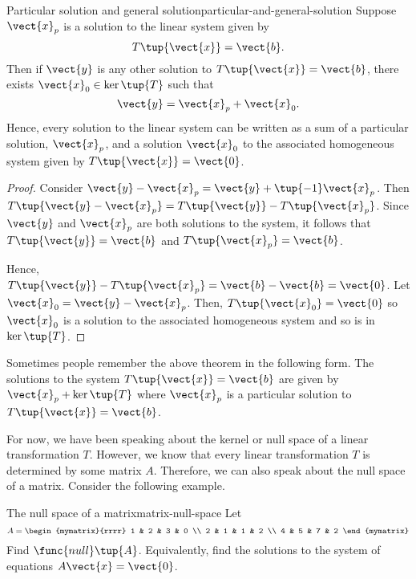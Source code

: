 \begin{theorem}{Particular solution and general solution}{particular-and-general-solution}
Suppose $\vect{x}_{p}$ is a solution to the linear system given by
\begin{equation*}
T\tup{\vect{x} } = \vect{b}.
\end{equation*}
Then if $\vect{y}$ is any other solution to $T\tup{\vect{x}}=\vect{b}$, 
 there exists $\vect{x}_0 \in \ker
\tup{T} $ such that
\begin{equation*}
\vect{y} = \vect{x}_{p}+ \vect{x}_0.
\end{equation*}
Hence, every solution to the linear system can be written as a sum of a particular solution, $\vect{x}_p$,
 and a solution $\vect{x}_0$ to the associated 
homogeneous system given by $T\tup{\vect{x}}=\vect{0}$.
\end{theorem}

\begin{proof}
Consider $\vect{y} - \vect{x}_{p}= \vect{y} + \tup{
-1} \vect{x}_{p}$. Then $T\tup{\vect{y} - \vect{x}_{p}} =T\tup{\vect{y}}
-T\tup{\vect{x}_{p} }$. Since $\vect{y}$ and $\vect{x}_{p}$ are both solutions to the system, it follows that $T\tup{\vect{y}}= \vect{b} $
and $T\tup{\vect{x}_p} = \vect{b}$. 

Hence, $T\tup{\vect{y}}-T\tup{\vect{x}_{p} }
=\vect{b} - \vect{b} = \vect{0}$.  Let $\vect{x}_0 = \vect{y} - \vect{x}_{p}$.
Then, $T\tup{\vect{x}_0}= \vect{0} $ so $\vect{x}_0$ is a solution to the associated homogeneous system and so is in $\ker \tup{T}$.
\end{proof}

Sometimes people remember the above theorem in the following form. The
solutions to the system $T\tup{\vect{x}}=\vect{b}$ are given by 
$\vect{x}_{p}+\ker \tup{T} $ where $\vect{x}_{p}$ is a particular
solution to $T\tup{\vect{x}}=\vect{b}$.

For now, we have been speaking about the kernel or null space of a linear transformation $T$. However, 
we know that every linear transformation $T$ is determined by some matrix $A$. Therefore,
we can also speak about the null space of a matrix. Consider the following example.  

\begin{example}{The null space of a matrix}{matrix-null-space}
Let
\begin{equation*}
A=\begin{mymatrix}{rrrr}
1 & 2 & 3 & 0 \\
2 & 1 & 1 & 2 \\
4 & 5 & 7 & 2
\end{mymatrix}
\end{equation*}
Find $\func{null} \tup{A}$. Equivalently, find the solutions to the
system of equations $A\vect{x}=\vect{0}$.
\end{example}


